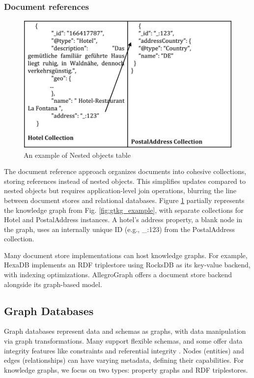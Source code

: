 \documentclass[12pt]{article}
\begin{document}
\subsubsection{Document references}
\begin{figure}
    \includegraphics[width=\linewidth]{imgs/Document references example.jpeg}
    \caption{An example of Nested objects table}
    \label{fig:document-ref-example}
\end{figure}
The document reference approach organizes documents into cohesive collections, storing references instead of nested objects. This simplifies updates compared to nested objects but requires application-level join operations, blurring the line between document stores and relational databases. Figure \ref{fig:document-ref-example} partially represents the knowledge graph from Fig. \ref{fig:gtkg_example}, with separate collections for Hotel and PostalAddress instances. A hotel's address property, a blank node in the graph, uses an internally unique ID (e.g., \_:123) from the PostalAddress collection.

Many document store implementations can host knowledge graphs. For example, HexaDB implements an RDF triplestore using RocksDB as its key-value backend, with indexing optimizations. AllegroGraph offers a document store backend alongside its graph-based model.

\subsection{Graph Databases}
Graph databases represent data and schemas as graphs, with data manipulation via graph transformations. Many support flexible schemas, and some offer data integrity features like constraints and referential integrity \cite{10.1145/1322432.1322433}. Nodes (entities) and edges (relationships) can have varying metadata, defining their capabilities. For knowledge graphs, we focus on two types: property graphs and RDF triplestores.
\end{document}

